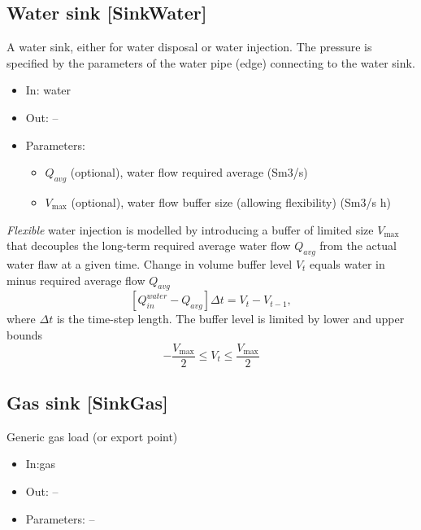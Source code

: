 \documentclass[12pt]{article}
\begin{document}
\subsection{Water sink [SinkWater]}

A  water sink, either for water disposal or water injection. The pressure is specified by the parameters of the water pipe (edge) connecting to the water sink.

\begin{itemize}
\item In: water
\item Out: --
\item Parameters:
\begin{itemize}[noitemsep,topsep=0pt]
	\item $Q_{avg}$  (optional), water flow required average (Sm3/s)
	\item $V_{\max }$ (optional),  water flow buffer size (allowing flexibility) (Sm3/s h) 
\end{itemize}
\end{itemize}

\medskip\noindent
\textit{Flexible} water injection is modelled by introducing a buffer of limited size $V_{\max }$ that decouples the long-term required average water flow  $Q_{avg}$ from the actual water flaw at a given time.
%
Change in volume buffer level  $V_{t}$  equals water in minus required average flow  \( Q_{avg} \) 
 \begin{equation}
 	\left[ Q_{in}^{water}-Q_{avg} \right]  \Delta t=V_{t}-V_{t-1}, 
 \end{equation}
where  $\Delta t$ is the time-step length.
%
The buffer level is limited by lower and upper bounds
 \begin{equation}
	 -\frac{V_{\max }}{2} \leq V_{t} \leq \frac{V_{\max }}{2} 
 \end{equation}





\subsection{Gas sink [SinkGas]}
Generic gas load (or export point)

\begin{itemize}
\item In:gas
\item Out: --
\item Parameters: --
\end{itemize}
\end{document}
